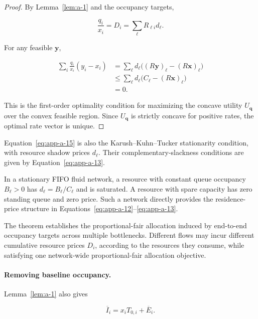 \begin{proof} By Lemma~\ref{lem:a-1} and the occupancy targets,

\begin{equation}
\label{eq:app-a-15}
\frac{q_i}{x_i}=D_i
=\sum_\ell R_{\ell i}d_\ell.
\end{equation}

For any feasible \(\mathbf y\),

\begin{equation}
\label{eq:app-a-16}
\begin{aligned}
\sum_i\frac{q_i}{x_i}(y_i-x_i)
&=\sum_\ell d_\ell
\big((R\mathbf y)_\ell-(R\mathbf x)_\ell\big)\\
&\le \sum_\ell d_\ell
\big(C_\ell-(R\mathbf x)_\ell\big)\\
&=0.
\end{aligned}
\end{equation}

This is the first-order optimality condition for maximizing the concave utility \(U_{\mathbf q}\) over the convex feasible region. Since \(U_{\mathbf q}\) is strictly concave for positive rates, the optimal rate vector is unique.
\end{proof}

Equation~\eqref{eq:app-a-15} is also the Karush–Kuhn–Tucker stationarity condition, with resource shadow prices \(d_\ell\). Their complementary-slackness conditions are given by Equation~\eqref{eq:app-a-13}.

In a stationary FIFO fluid network, a resource with constant queue occupancy \(B_\ell>0\) has \(d_\ell=B_\ell/C_\ell\) and is saturated. A resource with spare capacity has zero standing queue and zero price. Such a network directly provides the residence-price structure in Equations~\eqref{eq:app-a-12}–\eqref{eq:app-a-13}.

The theorem establishes the proportional-fair allocation induced by end-to-end occupancy targets across multiple bottlenecks. Different flows may incur different cumulative resource prices \(D_i\), according to the resources they consume, while satisfying one network-wide proportional-fair allocation objective.

\paragraph{Removing baseline occupancy.}

Lemma~\ref{lem:a-1} also gives

\begin{equation}
\label{eq:app-a-17}
\overline I_i=x_iT_{0,i}+\overline E_i.
\end{equation}

